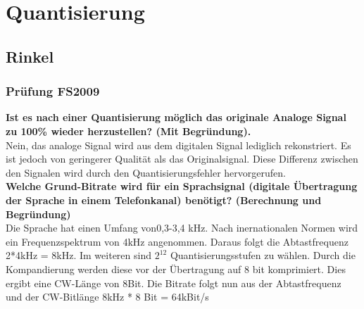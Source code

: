 

\section{Quantisierung}
\subsection{Rinkel}
\subsubsection{Prüfung FS2009}
\textbf{Ist es nach einer Quantisierung möglich das originale Analoge Signal zu 100\% wieder herzustellen? (Mit Begründung).}\\
Nein, das analoge Signal wird aus dem digitalen Signal lediglich rekonstriert. Es ist jedoch von geringerer Qualität als das Originalsignal. Diese Differenz zwischen den Signalen wird durch
den Quantisierungsfehler hervorgerufen.\\

\textbf{Welche Grund-Bitrate wird für ein Sprachsignal (digitale Übertragung der Sprache in einem Telefonkanal) benötigt? (Berechnung und Begründung)}\\
Die Sprache hat einen Umfang von0,3-3,4 kHz. Nach inernationalen Normen wird ein Frequenzspektrum von 4kHz angenommen. Daraus folgt die Abtastfrequenz 2*4kHz = 8kHz. Im weiteren sind $2^12$ Quantisierungsstufen zu wählen. Durch die Kompandierung werden diese vor der Übertragung auf 8 bit komprimiert. Dies ergibt eine CW-Länge von 8Bit. Die
Bitrate folgt nun aus der Abtastfrequenz und der CW-Bitlänge 8kHz * 8 Bit = 64kBit/s